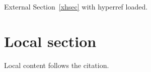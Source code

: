 \documentclass{article}
\begin{document}
External Section~\ref{xhsec} with hyperref loaded.
\section{Local section}
Local content follows the citation.
\end{document}
